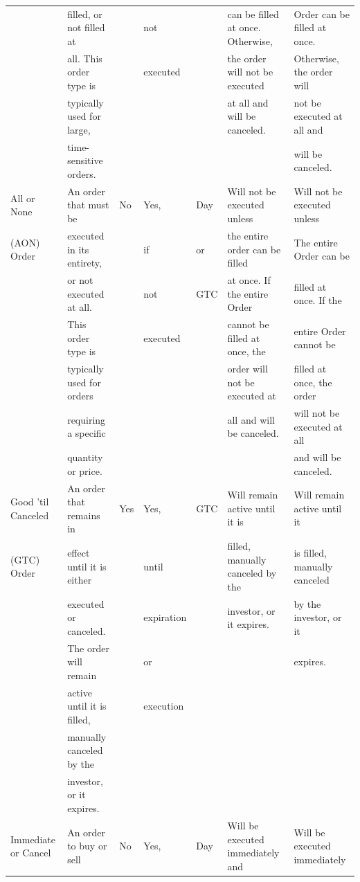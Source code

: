 \documentclass[11pt]{article}
\begin{document}
\begin{center}
\begin{tabular}{lllllll}
 & filled, or not filled at &  & not &  & can be filled at once. Otherwise, & Order can be filled at once.\\[0pt]
 & all. This order type is &  & executed &  & the order will not be executed & Otherwise, the order will\\[0pt]
 & typically used for large, &  &  &  & at all and will be canceled. & not be executed at all and\\[0pt]
 & time-sensitive orders. &  &  &  &  & will be canceled.\\[0pt]
\hline
All  or None & An order that must be & No & Yes, & Day & Will not be executed unless & Will not be executed unless\\[0pt]
(AON) Order & executed in its entirety, &  & if & or & the entire order can be filled & The entire Order can be\\[0pt]
 & or not executed at all. &  & not & GTC & at once. If the entire Order & filled at once. If the\\[0pt]
 & This order type is &  & executed &  & cannot be filled at once, the & entire Order cannot be\\[0pt]
 & typically used for orders &  &  &  & order will not be executed at & filled at once, the order\\[0pt]
 & requiring a specific &  &  &  & all and will be canceled. & will not be executed at all\\[0pt]
 & quantity or price. &  &  &  &  & and will be canceled.\\[0pt]
\hline
Good 'til Canceled & An order that remains in & Yes & Yes, & GTC & Will remain active until it is & Will remain active until it\\[0pt]
(GTC) Order & effect until it is either &  & until &  & filled, manually canceled by the & is filled, manually canceled\\[0pt]
 & executed or canceled. &  & expiration &  & investor, or it expires. & by the investor, or it\\[0pt]
 & The order will remain &  & or &  &  & expires.\\[0pt]
 & active until it is filled, &  & execution &  &  & \\[0pt]
 & manually canceled by the &  &  &  &  & \\[0pt]
 & investor, or it expires. &  &  &  &  & \\[0pt]
\hline
Immediate or Cancel & An order to buy or sell & No & Yes, & Day & Will be executed immediately and & Will be executed immediately\\[0pt]

\end{tabular}
\end{center}
\end{document}

